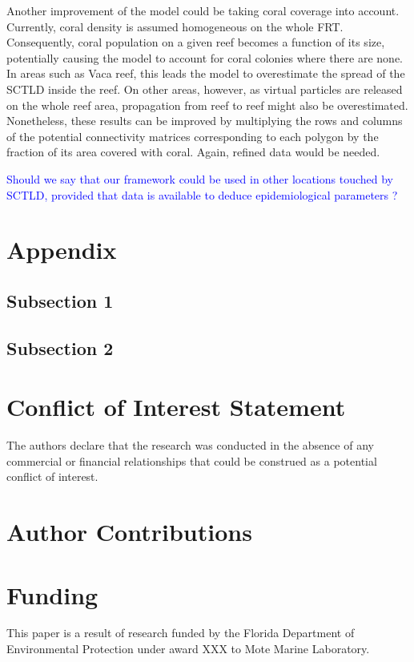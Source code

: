 \documentclass[utf8]{frontiersSCNS}
\begin{document}
Another improvement of the model could be taking coral coverage into account. Currently, coral density is assumed homogeneous on the whole FRT. Consequently, coral population on a given reef becomes a function of its size, potentially causing the model to account for coral colonies where there are none. In areas such as Vaca reef, this leads the model to overestimate the spread of the SCTLD inside the reef. On other areas, however, as virtual particles are released on the whole reef area, propagation from reef to reef might also be overestimated. Nonetheless, these results can be improved by multiplying the rows and columns of the potential connectivity matrices corresponding to each polygon by the fraction of its area covered with coral. Again, refined data would be needed.

\textcolor{blue}{Should we say that our framework could be used in other locations touched by SCTLD, provided that data is available to deduce epidemiological parameters ?}


\section*{Appendix}

\subsection*{Subsection 1}
\subsection*{Subsection 2}

\section*{Conflict of Interest Statement}
The authors declare that the research was conducted in the absence of any commercial or financial relationships that could be construed as a potential conflict of interest.

\section*{Author Contributions}
  
\section*{Funding}
This paper is a result of research funded by the Florida Department of Environmental Protection under award XXX to Mote Marine Laboratory. 
\end{document}
